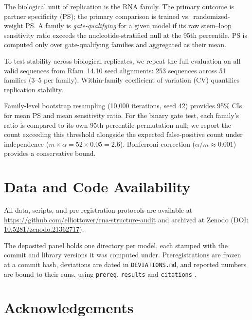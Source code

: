 \documentclass[11pt]{article}
\begin{document}
The biological unit of replication is the RNA family. The primary outcome is
partner specificity (PS); the primary comparison is trained vs.\
randomized-weight PS. A family is \emph{gate-qualifying} for a given model
if its raw stem--loop sensitivity ratio exceeds the nucleotide-stratified
null at the 95th percentile. PS is computed only over gate-qualifying
families and aggregated as their mean.

To test stability across biological replicates, we repeat the full
evaluation on all valid sequences from Rfam~14.10 seed alignments: 253
sequences across 51 families (3--5 per family). Within-family coefficient
of variation (CV) quantifies replication stability.

Family-level bootstrap resampling (10{,}000 iterations, seed 42)
provides 95\% CIs for mean PS and mean sensitivity ratio. For the binary
gate test, each family's ratio is compared to its own 95th-percentile
permutation null; we report the count exceeding this threshold alongside
the expected false-positive count under independence
($m \times \alpha = 52 \times 0.05 = 2.6$). Bonferroni correction
($\alpha / m \approx 0.001$) provides a conservative bound.


\section*{Data and Code Availability}

All data, scripts, and pre-registration protocols are available at
\url{https://github.com/elliottower/rna-structure-audit} and archived at
Zenodo (DOI: \href{https://doi.org/10.5281/zenodo.21362717}{10.5281/zenodo.21362717}).

The deposited panel holds one directory per model, each stamped with the commit
and library versions it was computed under. Preregistrations are frozen at a
commit hash, deviations are dated in \texttt{DEVIATIONS.md}, and reported numbers
are bound to their runs, using \texttt{prereg}, \texttt{results} and
\texttt{citations} \citep{tower2026reproducible}.


\section*{Acknowledgements}
\end{document}
